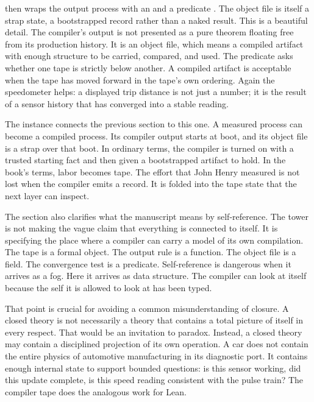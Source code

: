  then wraps the output process with an  and
a predicate . The object file is itself a strap state, a
bootstrapped record rather than a naked result. This is a beautiful detail.
The compiler's output is not presented as a pure theorem floating free from
its production history. It is an object file, which means a compiled artifact
with enough structure to be carried, compared, and used. The predicate
 asks whether one tape is strictly below another. A compiled
artifact is acceptable when the tape has moved forward in the tape's own
ordering. Again the speedometer helps: a displayed trip distance is not just a
number; it is the result of a sensor history that has converged into a stable
reading.

The instance  connects the previous section to this
one. A measured process can become a compiled process. Its compiler output
starts at boot, and its object file is a strap over that boot. In ordinary
terms, the compiler is turned on with a trusted starting fact and then given a
bootstrapped artifact to hold. In the book's terms, labor becomes tape. The
effort that John Henry measured is not lost when the compiler emits a record.
It is folded into the tape state that the next layer can inspect.

The section also clarifies what the manuscript means by self-reference. The
tower is not making the vague claim that everything is connected to itself.
It is specifying the place where a compiler can carry a model of its own
compilation. The tape is a formal object. The output rule is a function. The
object file is a field. The convergence test is a predicate. Self-reference is
dangerous when it arrives as a fog. Here it arrives as data structure. The
compiler can look at itself because the self it is allowed to look at has been
typed.

That point is crucial for avoiding a common misunderstanding of closure. A
closed theory is not necessarily a theory that contains a total picture of
itself in every respect. That would be an invitation to paradox. Instead, a
closed theory may contain a disciplined projection of its own operation. A car
does not contain the entire physics of automotive manufacturing in its
diagnostic port. It contains enough internal state to support bounded
questions: is this sensor working, did this update complete, is this speed
reading consistent with the pulse train? The compiler tape does the analogous
work for Lean.


